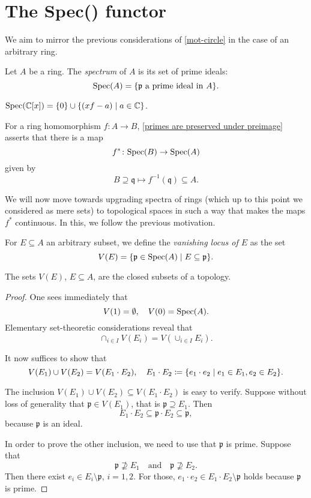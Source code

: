 \section{The Spec() functor}
We aim to mirror the previous considerations of \cref{mot-circle} in the case of an arbitrary ring.

\begin{df}
Let $A$ be a ring. The \textit{spectrum} of $A$ is its set of prime ideals:
\[\text{Spec}(A) = \{ \mathfrak p \text{ a prime ideal in } A \}.\]
\end{df}

\begin{example}
  $\text{Spec}(\mathbb C [x]) =  \{0\} \cup \{ (xf-a) \mathrel{|} a \in \mathbb C \}$.
\end{example}

For a ring homomorphism $f \colon A \to B$, \cref{primes are preserved under preimage} asserts that there is a map
\[f^* \colon \text{Spec}(B) \to \text{Spec}(A)\]
given by 
\[B \supseteq \mathfrak q \mapsto f^{-1}(\mathfrak q) \subseteq A.\]

We will now move towards upgrading spectra of rings (which up to this point we considered as mere sets) to topological spaces in such a way that makes the maps $f^*$ continuous. In this, we follow the previous motivation.

\begin{df}
For $E \subseteq A$ an arbitrary subset, we define the \textit{vanishing locus of $E$} as the set
\[V(E) = \{ \mathfrak p \in \text{Spec}(A) \mathrel{|} E \subseteq \mathfrak p \} .\]
\end{df}

\begin{prop}
  \label{zariski-prop}
  The sets $V(E)$, $E \subseteq A$, are the closed subsets of a topology.
\end{prop}

\begin{proof}
  One sees immediately that
  \[ V(1) = \emptyset, \quad V(0) = \text{Spec}(A).\]
  Elementary set-theoretic considerations reveal that
  \[\cap_{i \in I} V(E_i) = V(\cup_{i \in I} E_i).\]

  It now suffices to show that
\[ V(E_1) \cup V(E_2) = V(E_1 \cdot E_2), \quad E_1 \cdot E_2 \coloneqq \{ e_1 \cdot e_2 \mathrel{|} e_1 \in E_1, e_2 \in E_2 \}.\]

The inclusion $V(E_1) \cup V(E_2) \subseteq V(E_1 \cdot E_2)$ is easy to verify. Suppose without loss of generality that $\mathfrak p \in V(E_1)$, that is $\mathfrak p \supseteq E_1$. Then
\[ E_1 \cdot E_2 \subseteq \mathfrak p \cdot E_2 \subseteq \mathfrak p,\]
because $\mathfrak p$ is an ideal.

In order to prove the other inclusion, we need to use that $\mathfrak p$ is prime. Suppose that
\[ \mathfrak p \not\supseteq E_1 \quad \text{and} \quad \mathfrak p \not\supseteq E_2.\]
Then there exist $e_i \in E_i \setminus \mathfrak p$, $i=1,2$. For those,
\( e_1 \cdot e_2 \in E_1 \cdot E_2 \setminus \mathfrak p\)
holds because $\mathfrak p$ is prime.
\end{proof}

